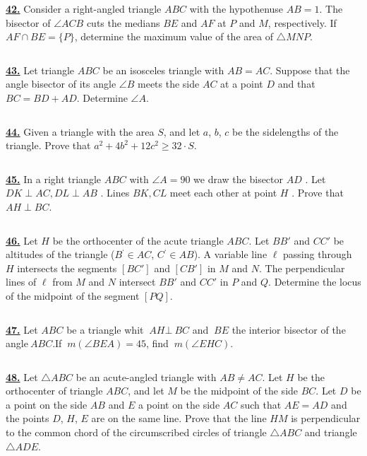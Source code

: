 \documentclass{article}
\begin{document}
$$ $$


\href{ http://www.artofproblemsolving.com/Forum/viewtopic.php?p=447144#p447144
}{\bf 42.} Consider a right-angled triangle $ABC$ with the hypothenuse $AB=1$. The bisector of $\angle{ACB}$ cuts the medians $BE$ and $AF$ at $P$ and $M$, respectively. If ${AF}\cap{BE}=\{P\}$, determine the maximum value of the area of $\triangle{MNP}$.



$$ $$

\href{http://www.artofproblemsolving.com/Forum/viewtopic.php?p=445337#p445337
 }{\bf 43.} Let triangle $ABC$ be an isosceles triangle with $AB = AC$. Suppose that the angle bisector of its angle $\angle B$ meets the side $AC$ at a point $D$ and that $BC = BD+AD$.
Determine $\angle A$.



$$ $$

\href{http://www.artofproblemsolving.com/Forum/viewtopic.php?p=443384#p443384
 }{\bf 44.} Given a triangle with the area $S$, and let $a$, $b$, $c$ be the sidelengths of the triangle. Prove that $a^{2}+4b^{2}+12c^{2}\geq 32\cdot S$.


$$ $$


\href{http://www.artofproblemsolving.com/Forum/viewtopic.php?p=431965#p431965
 }{\bf 45.} In a right triangle  $ABC$ with $\angle A = 90$  we draw the bisector $AD$ .  Let    $DK \perp AC , DL \perp AB$ .  Lines $BK , CL$ meet each other at  point $H$ .  Prove that $AH \perp BC$.

$$ $$



\href{ http://www.artofproblemsolving.com/Forum/viewtopic.php?p=181685#p181685
}{\bf 46.} Let $H$ be the orthocenter of the acute triangle $ABC$. Let $BB'$ and $CC'$ be altitudes of the triangle ($B^ \in AC$, $C^ \in AB$). A variable line $\ell$ passing through $H$ intersects the segments $[BC']$ and $[CB']$ in $M$ and $N$. The perpendicular lines of $\ell$ from $M$ and $N$ intersect $BB'$ and $CC'$ in $P$ and $Q$. Determine the locus of the midpoint of the segment $[ PQ]$.


$$ $$


\href{ http://www.artofproblemsolving.com/Forum/viewtopic.php?p=584865#p584865
}{\bf 47.} Let  $ABC$ be a triangle whit $\ AH\bot\ BC$ and $\ BE$ the interior bisector of the angle$\ ABC$.If $\ m(\angle BEA)=45$, find $\ m(\angle EHC).$


$$ $$


\href{ http://www.artofproblemsolving.com/Forum/viewtopic.php?p=519896#p519896
}{\bf 48.} Let $\triangle ABC$ be an acute-angled triangle with $AB \not= AC$. Let $H$ be the orthocenter of triangle $ABC$, and let $M$ be the midpoint of the side $BC$. Let $D$ be a point on the side $AB$ and $E$ a point on the side $AC$ such that $AE=AD$ and the points $D$, $H$, $E$ are on the same line. Prove that the line $HM$ is perpendicular to the common chord of the circumscribed circles of triangle $\triangle ABC$ and triangle $\triangle ADE$.
\end{document}
